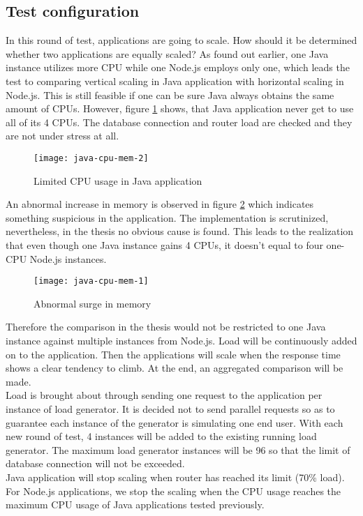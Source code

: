 \subsection{Test configuration}
 In this round of test, applications are going to scale. How should it be determined whether two applications are equally scaled? As found out earlier, one Java instance utilizes more CPU while one Node.js employs only one, which leads the test to comparing vertical scaling in Java application with horizontal scaling in Node.js. This is still feasible if one can be sure Java always obtains the same amount of CPUs. However, figure \ref{java-cpu-limit} shows, that Java application never get to use all of its 4 CPUs. The database connection and router load are checked and they are not under stress at all.  
 
 \begin{figure}[h]
 	\centering
 	\texttt{[image: java-cpu-mem-2]}
 	\caption{Limited CPU usage in Java application}
 	\label{java-cpu-limit}
 \end{figure}
An abnormal increase in memory is observed in figure \ref{java-mem-surge} which indicates something suspicious in the application. The implementation is scrutinized, nevertheless, in the thesis no obvious cause is found. This leads to the realization that even though one Java instance gains 4 CPUs, it doesn't equal to four one-CPU Node.js instances. 
 \begin{figure}[h]
	\centering
	\texttt{[image: java-cpu-mem-1]}
	\caption{Abnormal surge in memory}
	\label{java-mem-surge}
\end{figure}
Therefore the comparison in the thesis would not be restricted to one Java instance against multiple instances from Node.js. Load will be continuously added on to the application. Then the applications will scale when the response time shows a clear tendency to climb. At the end, an aggregated comparison will be made. \\
Load is brought about through sending one request to the application per instance of load generator. It is decided not to send parallel requests so as to guarantee each instance of the generator is simulating one end user. With each new round of test, 4 instances will be added to the existing running load generator. The maximum load generator instances will be 96 so that the limit of database connection will not be exceeded.\\
Java application will stop scaling when router has reached its limit (70\% load). For Node.js applications, we stop the scaling when the CPU usage reaches the maximum CPU usage of Java applications tested previously.
 
